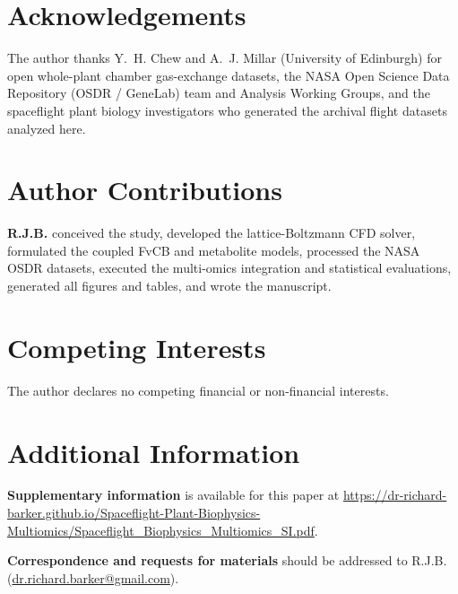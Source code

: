 \documentclass[10pt,twocolumn,a4paper]{article}
\begin{document}



\section*{Acknowledgements}

The author thanks Y.~H. Chew and A.~J. Millar (University of Edinburgh) for open whole-plant chamber gas-exchange datasets, the NASA Open Science Data Repository (OSDR / GeneLab) team and Analysis Working Groups, and the spaceflight plant biology investigators who generated the archival flight datasets analyzed here.

\section*{Author Contributions}

\textbf{R.J.B.} conceived the study, developed the lattice-Boltzmann CFD solver, formulated the coupled FvCB and metabolite models, processed the NASA OSDR datasets, executed the multi-omics integration and statistical evaluations, generated all figures and tables, and wrote the manuscript.

\section*{Competing Interests}

The author declares no competing financial or non-financial interests.

\section*{Additional Information}

\textbf{Supplementary information} is available for this paper at \url{https://dr-richard-barker.github.io/Spaceflight-Plant-Biophysics-Multiomics/Spaceflight_Biophysics_Multiomics_SI.pdf}.

\textbf{Correspondence and requests for materials} should be addressed to R.J.B. (\href{mailto:dr.richard.barker@gmail.com}{dr.richard.barker@gmail.com}).
\end{document}
